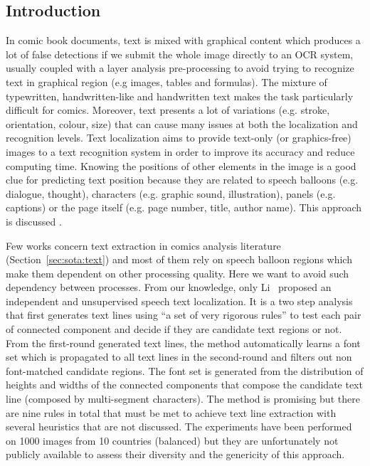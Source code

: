 \subsection{Introduction} %
\label{sub:in:text_introduction}

In comic book documents, text is mixed with graphical content which produces a lot of false detections if we submit the whole image directly to an OCR system, usually coupled with a layer analysis pre-processing to avoid trying to recognize text in graphical region (e.g images, tables and formulas).
The mixture of typewritten, handwritten-like and handwritten text makes the task particularly difficult for comics.
Moreover, text presents a lot of variations (e.g. stroke, orientation, colour, size) that can cause many issues at both the localization and recognition levels.
Text localization aims to provide text-only (or graphics-free) images to a text recognition system in order to improve its accuracy and reduce computing time.
Knowing the positions of other elements in the image is a good clue for predicting text position because they are related to speech balloons (e.g. dialogue, thought), characters (e.g. graphic sound, illustration), panels (e.g. captions) or the page itself (e.g. page number, title, author name).
This approach is discussed .

Few works concern text extraction in comics analysis literature (Section~\ref{sec:sota:text}) and most of them rely on speech balloon regions which make them dependent on other processing quality.
Here we want to avoid such dependency between processes.
From our knowledge, only Li~\cite{Li2013Unsupervised} proposed an independent and unsupervised speech text localization.
It is a two step analysis that first generates text lines using ``a set of very rigorous rules'' to test each pair of connected component and decide if they are candidate text regions or not.
From the first-round generated text lines, the method automatically learns a font set which is propagated to all text lines in the second-round and filters out non font-matched candidate regions.
The font set is generated from the distribution of heights and widths of the connected components that compose the candidate text line (composed by multi-segment characters).
The method is promising but there are nine rules in total that must be met to achieve text line extraction with several heuristics that are not discussed.
The experiments have been performed on 1000 images from 10 countries (balanced) but they are unfortunately not publicly available to assess their diversity and the genericity of this approach. 

